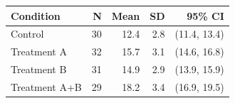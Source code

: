 \begin{tabular}{lrrrr}
\toprule
Condition & N & Mean & SD & 95\% CI \\
\midrule
Control       & 30 & 12.4 & 2.8 & (11.4, 13.4) \\
Treatment A   & 32 & 15.7 & 3.1 & (14.6, 16.8) \\
Treatment B   & 31 & 14.9 & 2.9 & (13.9, 15.9) \\
Treatment A+B & 29 & 18.2 & 3.4 & (16.9, 19.5) \\
\bottomrule
\end{tabular}
